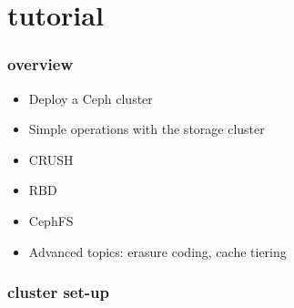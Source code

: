 \documentclass[10pt, compress]{beamer}
\begin{document}
\section{tutorial}
\begin{frame}[fragile]
    \frametitle{overview}
    \begin{itemize}
        \item Deploy a Ceph cluster
        \item Simple operations with the storage cluster
        \item CRUSH
        \item RBD
        \item CephFS
        \item Advanced topics: erasure coding, cache tiering
    \end{itemize}
\end{frame}

\begin{frame}[fragile]
    \frametitle{cluster set-up}
    \begin{center}
        
    \end{center}
\end{frame}

\end{document}
